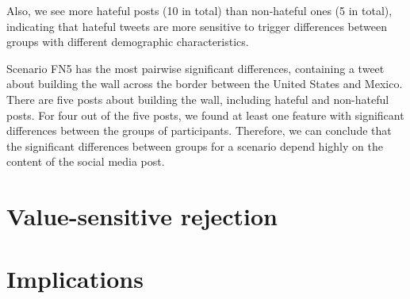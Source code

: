 %
Also, we see more hateful posts (10 in total) than non-hateful ones (5 in total), indicating that hateful tweets are more sensitive to trigger differences between groups with different demographic characteristics.
%

%
Scenario FN5 has the most pairwise significant differences, containing a tweet about building the wall across the border between the United States and Mexico.
%
There are five posts about building the wall, including hateful and non-hateful posts.
%
For four out of the five posts, we found at least one feature with significant differences between the groups of participants.
%
Therefore, we can conclude that the significant differences between groups for a scenario depend highly on the content of the social media post.
%


\section{Value-sensitive rejection}
\label{sec:discussion-rejection}

\section{Implications}



